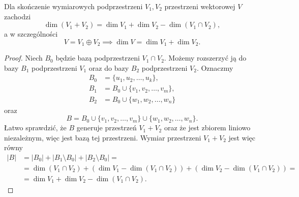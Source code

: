 \begin{theorem}[Grassmana]
    Dla skończenie wymiarowych podprzestrzeni $V_1, V_2$ przestrzeni wektorowej $V$ zachodzi
    \[ \dim(V_1 + V_2) = \dim V_1 + \dim V_2 - \dim(V_1 \cap V_2), \]
    a w szczególności
    \[ V = V_1 \oplus V_2 \implies \dim V = \dim V_1 + \dim V_2. \]
\end{theorem}
\begin{proof}
    Niech $B_0$ będzie bazą podprzestrzeni $V_1 \cap V_2$. Możemy rozszerzyć ją do bazy $B_1$ podprzestrzeni $V_1$ oraz do bazy $B_2$ podprzestrzeni $V_2$. Oznaczmy
    \begin{align*}
        B_0 &= \{u_1, u_2, \ldots, u_k\}, \\
        B_1 &= B_0 \cup \{v_1, v_2, \ldots, v_m\}, \\
        B_2 &= B_0 \cup \{w_1, w_2, \ldots, w_n\}
    \end{align*}
    oraz
    \[ B = B_0 \cup \{v_1, v_2, \ldots, v_m\} \cup \{w_1, w_2, \ldots, w_n\}. \]
    Łatwo sprawdzić, że $B$ generuje przestrzeń $V_1 + V_2$ oraz że jest zbiorem liniowo niezależnym, więc jest bazą tej przestrzeni. Wymiar przestrzeni $V_1 + V_2$ jest więc równy
    \begin{align*}
        |B| &= |B_0| + |B_1 \setminus B_0| + |B_2 \setminus B_0| = \\
        &= \dim(V_1 \cap V_2) + (\dim V_1 - \dim(V_1 \cap V_2)) + (\dim V_2 - \dim(V_1 \cap V_2)) = \\
        &= \dim V_1 + \dim V_2 - \dim(V_1 \cap V_2).
    \end{align*}
\end{proof}